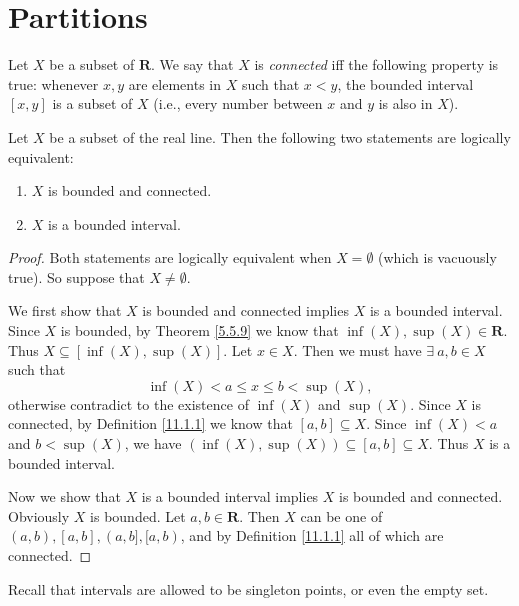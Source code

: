 \section{Partitions}\label{sec 11.1}

\begin{definition}\label{11.1.1}
    Let \(X\) be a subset of \(\mathbf{R}\).
    We say that \(X\) is \emph{connected} iff the following property is true:
    whenever \(x, y\) are elements in \(X\) such that \(x < y\), the bounded interval \([x, y]\) is a subset of \(X\)
    (i.e., every number between \(x\) and \(y\) is also in \(X\)).
\end{definition}

\setcounter{theorem}{3}
\begin{lemma}\label{11.1.4}
    Let \(X\) be a subset of the real line.
    Then the following two statements are logically equivalent:
    \begin{enumerate}
        \item \(X\) is bounded and connected.
        \item \(X\) is a bounded interval.
    \end{enumerate}
\end{lemma}

\begin{proof}
    Both statements are logically equivalent when \(X = \emptyset\) (which is vacuously true).
    So suppose that \(X \neq \emptyset\).

    We first show that \(X\) is bounded and connected implies \(X\) is a bounded interval.
    Since \(X\) is bounded, by Theorem \ref{5.5.9} we know that \(\inf(X), \sup(X) \in \mathbf{R}\).
    Thus \(X \subseteq [\inf(X), \sup(X)]\).
    Let \(x \in X\).
    Then we must have \(\exists\ a, b \in X\) such that
    \[
        \inf(X) < a \leq x \leq b < \sup(X),
    \]
    otherwise contradict to the existence of \(\inf(X)\) and \(\sup(X)\).
    Since \(X\) is connected, by Definition \ref{11.1.1} we know that \([a, b] \subseteq X\).
    Since \(\inf(X) < a\) and \(b < \sup(X)\), we have \((\inf(X), \sup(X)) \subseteq [a, b] \subseteq X\).
    Thus \(X\) is a bounded interval.

    Now we show that \(X\) is a bounded interval implies \(X\) is bounded and connected.
    Obviously \(X\) is bounded.
    Let \(a, b \in \mathbf{R}\).
    Then \(X\) can be one of \((a, b), [a, b], (a, b], [a, b)\), and by Definition \ref{11.1.1} all of which are connected.
\end{proof}

\begin{remark}\label{11.1.5}
    Recall that intervals are allowed to be singleton points, or even the empty set.
\end{remark}